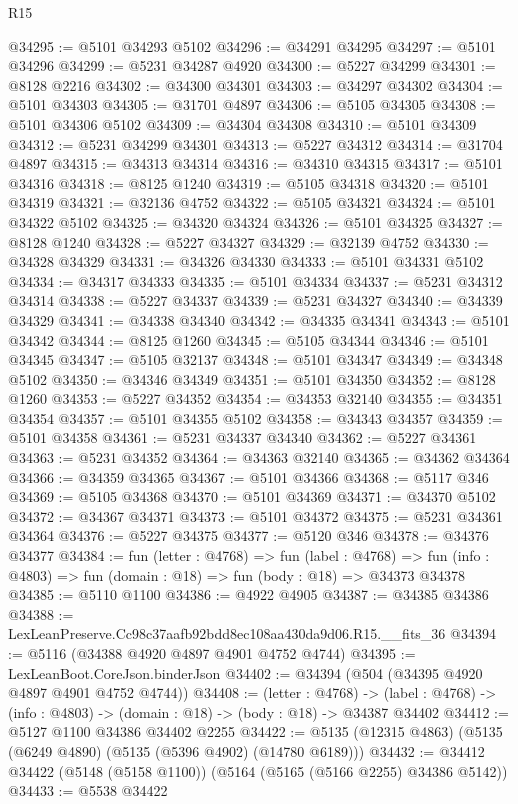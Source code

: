 \begin{lexlean}{R15}
\begin{coremodule}
{{{{{{{{{{{@34295 := @5101 @34293 @5102
@34296 := @34291 @34295
@34297 := @5101 @34296
@34299 := @5231 @34287 @4920
@34300 := @5227 @34299
@34301 := @8128 @2216
@34302 := @34300 @34301
@34303 := @34297 @34302
@34304 := @5101 @34303
@34305 := @31701 @4897
@34306 := @5105 @34305
@34308 := @5101 @34306 @5102
@34309 := @34304 @34308
@34310 := @5101 @34309
@34312 := @5231 @34299 @34301
@34313 := @5227 @34312
@34314 := @31704 @4897
@34315 := @34313 @34314
@34316 := @34310 @34315
@34317 := @5101 @34316
@34318 := @8125 @1240
@34319 := @5105 @34318
@34320 := @5101 @34319
@34321 := @32136 @4752
@34322 := @5105 @34321
@34324 := @5101 @34322 @5102
@34325 := @34320 @34324
@34326 := @5101 @34325
@34327 := @8128 @1240
@34328 := @5227 @34327
@34329 := @32139 @4752
@34330 := @34328 @34329
@34331 := @34326 @34330
@34333 := @5101 @34331 @5102
@34334 := @34317 @34333
@34335 := @5101 @34334
@34337 := @5231 @34312 @34314
@34338 := @5227 @34337
@34339 := @5231 @34327
@34340 := @34339 @34329
@34341 := @34338 @34340
@34342 := @34335 @34341
@34343 := @5101 @34342
@34344 := @8125 @1260
@34345 := @5105 @34344
@34346 := @5101 @34345
@34347 := @5105 @32137
@34348 := @5101 @34347
@34349 := @34348 @5102
@34350 := @34346 @34349
@34351 := @5101 @34350
@34352 := @8128 @1260
@34353 := @5227 @34352
@34354 := @34353 @32140
@34355 := @34351 @34354
@34357 := @5101 @34355 @5102
@34358 := @34343 @34357
@34359 := @5101 @34358
@34361 := @5231 @34337 @34340
@34362 := @5227 @34361
@34363 := @5231 @34352
@34364 := @34363 @32140
@34365 := @34362 @34364
@34366 := @34359 @34365
@34367 := @5101 @34366
@34368 := @5117 @346
@34369 := @5105 @34368
@34370 := @5101 @34369
@34371 := @34370 @5102
@34372 := @34367 @34371
@34373 := @5101 @34372
@34375 := @5231 @34361 @34364
@34376 := @5227 @34375
@34377 := @5120 @346
@34378 := @34376 @34377
@34384 := fun (letter : @4768) =>
  fun (label : @4768) =>
  fun (info : @4803) => fun (domain : @18) => fun (body : @18) => @34373 @34378
@34385 := @5110 @1100
@34386 := @4922 @4905
@34387 := @34385 @34386
@34388 := LexLeanPreserve.Cc98c37aafb92bdd8ec108aa430da9d06.R15.__fits_36
@34394 := @5116 (@34388 @4920 @4897 @4901 @4752 @4744)
@34395 := LexLeanBoot.CoreJson.binderJson
@34402 := @34394 (@504 (@34395 @4920 @4897 @4901 @4752 @4744))
@34408 := (letter : @4768) ->
  (label : @4768) -> (info : @4803) -> (domain : @18) -> (body : @18) -> @34387 @34402
@34412 := @5127 @1100 @34386 @34402 @2255
@34422 := @5135 (@12315 @4863) (@5135 (@6249 @4890) (@5135 (@5396 @4902) (@14780 @6189)))
@34432 := @34412 @34422 (@5148 (@5158 @1100)) (@5164 (@5165 (@5166 @2255) @34386 @5142))
@34433 := @5538 @34422
}}}}}}}}}}}
\end{coremodule}
\end{lexlean}
